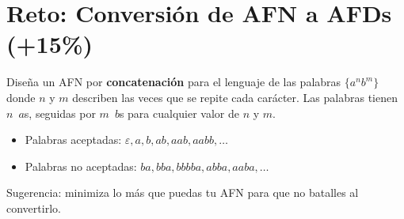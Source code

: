 \documentclass[8pt, onside]{article}
\begin{document}
\section*{Reto: Conversión de AFN a AFDs (+15\%)}

Diseña un AFN por \textbf{concatenación} para el lenguaje de las palabras $\{a^n b^m\}$ donde $n$ y $m$ describen las veces que se repite cada carácter.
Las palabras tienen $n \,$ $a$s, seguidas por $m \,$ $b$s para cualquier valor de $n$ y $m$.

\begin{itemize}
    \item Palabras aceptadas: $\varepsilon, a, b, ab, aab, aabb, \dots$
    \item Palabras no aceptadas: $ba, bba, bbbba, abba, aaba, \dots$
\end{itemize}

Sugerencia: minimiza lo más que puedas tu AFN para que no batalles al convertirlo.
\end{document}
